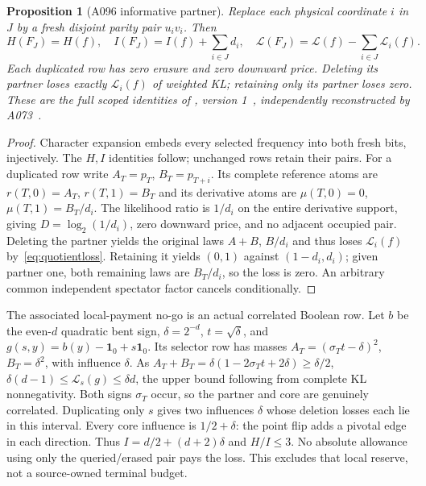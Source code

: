 \documentclass[11pt]{article}
\newtheorem{proposition}[lemma]{Proposition}
\begin{document}
\begin{proposition}[A096 informative partner]\label{prop:partner}
Replace each physical coordinate $i$ in $J$ by a fresh disjoint parity pair
$u_i v_i$. Then
\[
 H(F_J)=H(f),\quad I(F_J)=I(f)+\sum_{i\in J}d_i,
 \quad\mathcal L(F_J)=\mathcal L(f)-\sum_{i\in J}\mathcal L_i(f).
\]
Each duplicated row has zero erasure and zero downward price.
Deleting its partner loses exactly $\mathcal L_i(f)$ of weighted KL;
retaining only its partner loses zero. These are the full scoped identities
of , version 1~\cite{A096d},
independently reconstructed by A073~\cite{A073d}.
\end{proposition}
\begin{proof}
Character expansion embeds every selected frequency into both fresh bits,
injectively. The $H,I$ identities follow; unchanged rows retain their pairs.
For a duplicated row write $A_T=p_T$, $B_T=p_{T+i}$.
Its complete reference atoms are $r(T,0)=A_T$, $r(T,1)=B_T$ and its
derivative atoms are $\mu(T,0)=0$, $\mu(T,1)=B_T/d_i$.
The likelihood ratio is $1/d_i$ on the entire derivative support, giving
$D=\log_2(1/d_i)$, zero downward price, and no adjacent occupied pair.
Deleting the partner yields the original laws $A+B$, $B/d_i$ and thus
loses $\mathcal L_i(f)$ by~\eqref{eq:quotientloss}.
Retaining it yields $(0,1)$ against $(1-d_i,d_i)$; given partner one,
both remaining laws are $B_T/d_i$, so the loss is zero.
An arbitrary common independent spectator factor cancels conditionally.
\end{proof}
The associated local-payment no-go is an actual correlated Boolean row.
Let $b$ be the even-$d$ quadratic bent sign, $\delta=2^{-d}$, $t=\sqrt\delta$,
and $g(s,y)=b(y)-\mathbf1_0+s\mathbf1_0$. Its selector row has masses
$A_T=(\sigma_Tt-\delta)^2$, $B_T=\delta^2$, with influence $\delta$.
As $A_T+B_T=\delta(1-2\sigma_Tt+2\delta)\ge\delta/2$,
$\delta(d-1)\le\mathcal L_s(g)\le\delta d$, the upper bound following
from complete KL nonnegativity. Both signs $\sigma_T$ occur, so the partner
and core are genuinely correlated. Duplicating only $s$ gives two
influences $\delta$ whose deletion losses each lie in this interval.
Every core influence is $1/2+\delta$: the point flip adds a pivotal edge
in each direction. Thus $I=d/2+(d+2)\delta$ and $H/I\le3$.
No absolute allowance using only the queried/erased pair pays the loss.
This excludes that local reserve, not a source-owned terminal budget.
\end{document}
